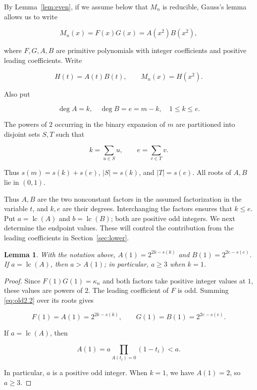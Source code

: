 \documentclass[11pt,a4paper]{article}
\numberwithin{equation}{section}
\newtheorem{lemma}[theorem]{Lemma}
\theoremstyle{definition}
\begin{document}
By Lemma~\ref{lem:even}, if we assume below that \(M_n\) is reducible, Gauss's lemma allows us to write

\begin{equation}
M_n(x)=F(x)G(x)=A(x^2)B(x^2),
\label{eq:old2.3}
\end{equation}

where \(F,G,A,B\) are primitive polynomials with integer coefficients and positive leading coefficients. Write

\[
H(t)=A(t)B(t),\qquad M_n(x)=H(x^2).
\]

Also put

\[
\deg A=k,\quad\deg B=e=m-k,\quad1\le k\le e.
\]

The powers of \(2\) occurring in the binary expansion of \(m\) are partitioned into disjoint sets \(S,T\) such that

\begin{equation}
k=\sum_{u\in S}u,\qquad e=\sum_{v\in T}v.
\label{eq:old2.4}
\end{equation}

Thus \(s(m)=s(k)+s(e)\), \(|S|=s(k)\), and \(|T|=s(e)\). All roots of \(A,B\) lie in \((0,1)\).

Thus \(A,B\) are the two nonconstant factors in the assumed factorization in the variable \(t\), and \(k,e\) are their degrees. Interchanging the factors ensures that \(k\le e\). Put \(a=\operatorname{lc}(A)\) and \(b=\operatorname{lc}(B)\); both are positive odd integers. We next determine the endpoint values. These will control the contribution from the leading coefficients in Section~\ref{sec:lower}.

\begin{lemma}\label{lem:endpoint}
With the notation above, \(A(1)=2^{2k-s(k)}\) and \(B(1)=2^{2e-s(e)}\). If \(a=\operatorname{lc}(A)\), then \(a>A(1)\); in particular, \(a\ge3\) when \(k=1\).
\end{lemma}

\begin{proof}
Since \(F(1)G(1)=\kappa_n\) and both factors take positive integer values at \(1\), these values are powers of \(2\). The leading coefficient of \(F\) is odd. Summing \eqref{eq:old2.2} over its roots gives

\begin{equation}
F(1)=A(1)=2^{2k-s(k)},\qquad
G(1)=B(1)=2^{2e-s(e)}.
\label{eq:old2.5}
\end{equation}

If \(a=\operatorname{lc}(A)\), then

\begin{equation}
A(1)=a\prod_{A(t_i)=0}(1-t_i)<a.
\label{eq:old2.6}
\end{equation}

In particular, \(a\) is a positive odd integer. When \(k=1\), we have \(A(1)=2\), so \(a\ge3\).
\end{proof}
\end{document}
